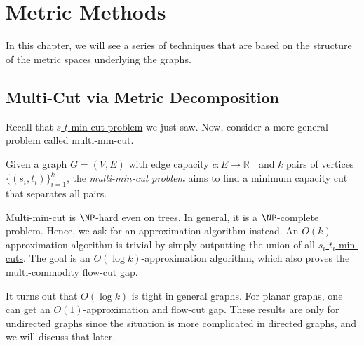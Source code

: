 \chapter{Metric Methods}
In this chapter, we will see a series of techniques that are based on the structure of the metric spaces underlying the graphs.

\section{Multi-Cut via Metric Decomposition}
Recall that \hyperref[prb:s-t-min-cut]{\(s\)-\(t\) min-cut problem} we just saw. Now, consider a more general problem called \hyperref[prb:multi-min-cut]{multi-min-cut}.

\begin{problem}\label{prb:multi-min-cut}
Given a graph \(G = (V, E)\) with edge capacity \(c \colon E \to \mathbb{R} _{+}\) and \(k\) pairs of vertices \(\{ (s_i, t_i) \} _{i=1}^{k}\), the \emph{multi-min-cut problem} aims to find a minimum capacity cut that separates all pairs.
\end{problem}

\hyperref[prb:multi-min-cut]{Multi-min-cut} is \(\NP\)-hard even on trees. In general, it is a \(\NP\)-complete problem. Hence, we ask for an approximation algorithm instead. An \(O(k)\)-approximation algorithm is trivial by simply outputting the union of all \hyperref[prb:s-t-min-cut]{\(s_i\)-\(t_i\) min-cuts}. The goal is an \(O(\log k)\)-approximation algorithm, which also proves the multi-commodity flow-cut gap.

\begin{note}
	It turns out that \(O(\log k)\) is tight in general graphs. For planar graphs, one can get an \(O(1)\)-approximation and flow-cut gap. These results are only for undirected graphs since the situation is more complicated in directed graphs, and we will discuss that later.
\end{note}

